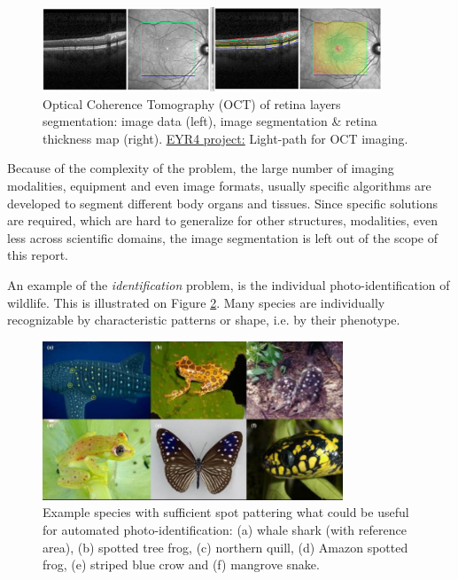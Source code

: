 \begin{figure}[H]
\begin{center}
\includegraphics[width=0.9\textwidth]{fig/oct}
\end{center}
\caption{Optical Coherence Tomography (OCT) of retina layers segmentation: image data (left), image segmentation \& retina thickness map (right). \href{https://blog.surf.nl/eyr4-blog-7-lightpath-optical-coherence-tomography-oct-imaging/}{\underline{EYR4 project:}} Light-path for OCT imaging.}
\label{fig:oct}
\end{figure}

Because of the complexity of the problem, the large number of imaging modalities, equipment and even image formats, usually specific algorithms are developed to segment different body organs and tissues. Since specific solutions are required, which are hard to generalize for other structures, modalities, even less across scientific domains, the image segmentation is left out of the scope of this report.


An example of the {\em identification} problem, is the individual photo-identification of wildlife. This is illustrated on Figure \ref{fig:photoid}. Many species are individually recognizable by characteristic patterns or shape, i.e. by their phenotype.


\begin{figure}[H]
\begin{center}
\includegraphics[width=0.8\textwidth]{fig/photoid}
\end{center}
\caption{Example species with sufficient spot pattering what could be useful for automated photo-identification: (a) whale shark (with reference area),
(b) spotted  tree frog, (c) northern quill, (d) Amazon spotted frog, (e) striped blue crow and (f) mangrove snake.}
\label{fig:photoid}
\end{figure}

